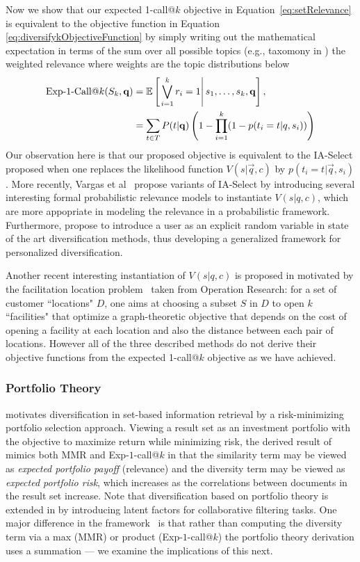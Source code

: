 Now we show that our expected 1-call@$k$ objective in Equation~\eqref{eq:setRelevance} is equivalent to the objective function in Equation \eqref{eq:diversifykObjectiveFunction} by simply writing out the mathematical expectation in terms of the sum over all possible topics (e.g., taxomony in \cite{agrawal09diversifying}) the weighted relevance where weights are the topic distributions below
\begin{align*}
    \ExpOneCall(S_k,\vec{q}) & = \mathbb{E} \left[\left. \bigvee_{i=1}^{k}r_i=1 \right| s_{1},\dots, s_{k},\vec{q} \right], \\
    												 & = \sum_{t\in T} P(t|\vec{q}) \left( 1 - \prod_{i=1}^{k}(1-p(t_i = t| q, s_i))\right) 
\end{align*}
Our observation here is that our proposed objective is equivalent to the IA-Select proposed \cite{agrawal09Diversifying} when one replaces the likelihood function $V(s|\vec{q}, c)$ by $p(t_i = t| \vec{q}, s_i)$. More recently, Vargas et al~\cite{Vargas:SIGIR2012} propose variants of IA-Select by introducing several interesting formal probabilistic relevance models to instantiate $V(s| q, c)$, which are more appopriate in modeling the relevance in a probabilistic framework. Furthermore, \cite{Vallet:SIGIR2012} propose to introduce a user as an explicit random variable in state of the art diversification methods, thus developing a generalized framework for personalized diversification.

Another recent interesting instantiation of $V(s|q,c)$ is proposed in \cite{Zuccon:ECIR2012} motivated by the facilitation location problem~\cite{Gonzalez:Handbook2007} taken from Operation Research: for a set of customer ``locations" $D$, one aims at choosing a subset $S$ in $D$ to open $k$ ``facilities" that optimize a graph-theoretic objective that depends on the cost of opening a facility at each location and also the distance between each pair of locations. However all of the three described methods do not derive their objective functions from the expected 1-call@$k$ objective as we have achieved. 

\subsubsection{Portfolio Theory}
\cite{wang09PortfolioTheory} motivates
diversification in set-based information retrieval by a
risk-minimizing portfolio selection approach.  Viewing a result set as
an investment portfolio with the objective to maximize return while
minimizing risk, the derived result of~\cite{wang09PortfolioTheory}
mimics both MMR and Exp-$1$-call@$k$ in that the similarity term may
be viewed as \emph{expected portfolio payoff} (relevance) and the
diversity term may be viewed as \emph{expected portfolio risk}, which
increases as the correlations between documents in the result set
increase. Note that diversification based on portfolio theory is extended in \cite{Shi:SIGIR2012} by introducing latent factors for collaborative filtering tasks. One major difference in the framework~\cite{wang09PortfolioTheory} is that rather than
computing the diversity term via a max (MMR) or product
(Exp-$1$-call@$k$) the portfolio theory derivation uses a summation
--- we examine the implications of this next.

